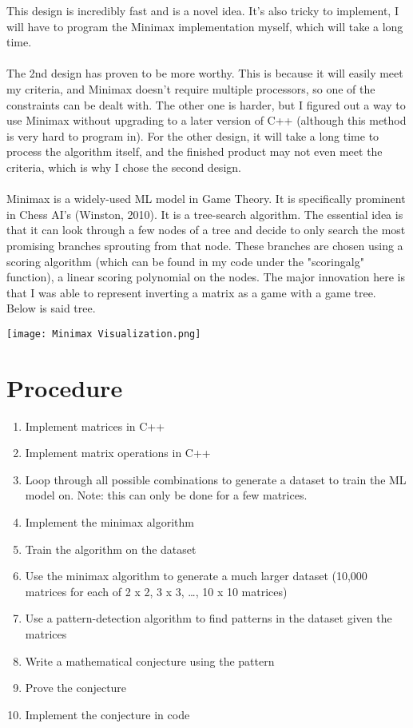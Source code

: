 \documentclass{article}
\begin{document}
This design is incredibly fast and is a novel idea. It’s also tricky to implement, I will have to program the Minimax implementation myself, which will take a long time.
\\ \\ 
The 2nd design has proven to be more worthy. This is because it will easily meet my criteria, and Minimax doesn’t require multiple processors, so one of the constraints can be dealt with. The other one is harder, but I figured out a way to use Minimax without upgrading to a later version of C++ (although this method is very hard to program in). For the other design, it will take a long time to process the algorithm itself, and the finished product may not even meet the criteria, which is why I chose the second design. 
\\ \\
Minimax is a widely-used ML model in Game Theory. It is specifically prominent in Chess AI's (Winston, 2010). It is a tree-search algorithm. The essential idea is that it can look through a few nodes of a tree and decide to only search the most promising branches sprouting from that node. These branches are chosen using a scoring algorithm (which can be found in my code under the "scoringalg" function), a linear scoring polynomial on the nodes. The major innovation here is that I was able to represent inverting a matrix as a game with a game tree. Below is said tree.
\begin{center}\texttt{[image: Minimax Visualization.png]}\end{center}
\section*{Procedure}
\begin{enumerate}
\item Implement matrices in C++
\item Implement matrix operations in C++
\item Loop through all possible combinations to generate a dataset to train       the ML model on. Note: this can only be done for a few matrices.
\item Implement the minimax algorithm
\item Train the algorithm on the dataset
\item Use the minimax algorithm to generate a much larger dataset (10,000         matrices for each of 2 x 2, 3 x 3, …, 10 x 10 matrices)
\item Use a pattern-detection algorithm to find patterns in the dataset           given the matrices
\item Write a mathematical conjecture using the pattern 
\item Prove the conjecture
\item Implement the conjecture in code
\end{enumerate}
\end{document}
